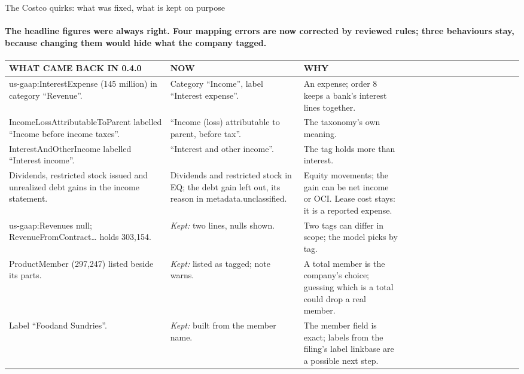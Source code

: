 \documentclass[aspectratio=169,10pt]{beamer}
\newcommand{\kicker}{}
\newcommand{\stcode}{}\newcommand{\stcheck}{}
\newcommand{\status}[2]{\renewcommand{\stcode}{#1}\renewcommand{\stcheck}{#2}}
\newcommand{\cd}[1]{{\ttfamily\fontsize{4.6}{6.15}\selectfont #1}}
\newcommand{\thead}[1]{{\ttfamily\color{muted}\fontsize{5}{6}\selectfont #1}}
\newcommand{\tstart}{\hline\noalign{\vspace{0.8mm}}}
\newcommand{\tmid}{\\[0.4mm]\hline\noalign{\vspace{0.8mm}}}
\newcommand{\tend}{\\[0.4mm]\hline}
\newenvironment{tbl}[1][5.4]{\centering\fontsize{#1}{\numexpr0\relax}\selectfont\fontsize{#1}{1.27\dimexpr#1pt\relax}\selectfont
  \renewcommand{\arraystretch}{1.08}\setlength{\tabcolsep}{1.6mm}}{\par}
\begin{document}
\renewcommand{\kicker}{18 · limitations · seen in the examples}
\status{Seen in the Costco calls of 2026-10-17 (Examples 1 and 4), before and after the fixes of version 0.5.0; causes in \cd{sec\_tag\_mapping.json} and in Costco's own member names.}{\cd{test\_tools\_offline.py} (classifier and segment cases) holds each row's current behaviour.}
\begin{frame}{The Costco quirks: what was fixed, what is kept on purpose}
\framesubtitle{The headline figures were always right. Four mapping errors are now corrected by reviewed rules; three behaviours stay, because changing them would hide what the company tagged.}
\begin{tbl}[5.0]
\begin{tabular}{@{}P{48mm}P{48mm}P{45mm}@{}}
\tstart
\thead{WHAT CAME BACK IN 0.4.0} & \thead{NOW} & \thead{WHY} \tmid
\cd{us-gaap:InterestExpense} (145 million) in category ``Revenue''. & Category ``Income'', label ``Interest expense''. & An expense; order 8 keeps a bank's interest lines together. \tmid
\cd{IncomeLossAttributableToParent} labelled ``Income before income taxes''. & ``Income (loss) attributable to parent, before tax''. & The taxonomy's own meaning. \tmid
\cd{InterestAndOtherIncome} labelled ``Interest income''. & ``Interest and other income''. & The tag holds more than interest. \tmid
Dividends, restricted stock issued and unrealized debt gains in the income statement. & Dividends and restricted stock in EQ; the debt gain left out, its reason in \cd{metadata.unclassified}. & Equity movements; the gain can be net income or OCI. Lease cost stays: it is a reported expense. \tmid
\cd{us-gaap:Revenues} null; \cd{RevenueFromContract\ldots} holds 303,154. & \textit{Kept:} two lines, nulls shown. & Two tags can differ in scope; the model picks by \cd{tag}. \tmid
\cd{ProductMember} (297,247) listed beside its parts. & \textit{Kept:} listed as tagged; \cd{note} warns. & A total member is the company's choice; guessing which is a total could drop a real member. \tmid
Label ``Foodand Sundries''. & \textit{Kept:} built from the member name. & The \cd{member} field is exact; labels from the filing's label linkbase are a possible next step. \tend
\end{tabular}
\end{tbl}
\end{frame}
\end{document}
